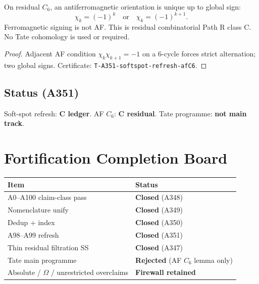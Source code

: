\begin{theorem}
\label{thm:A351-AF}
On residual $C_6$, an antiferromagnetic orientation is unique up to global sign:
\begin{equation}
\chi_k=(-1)^k
\quad\text{or}\quad
\chi_k=(-1)^{k+1}.
\end{equation}
Ferromagnetic signing is not AF. This is residual combinatorial Path R class C. No Tate cohomology is used or required.
\end{theorem}

\begin{proof}
Adjacent AF condition $\chi_k\chi_{k+1}=-1$ on a 6-cycle forces strict alternation; two global signs. Certificate: \texttt{T-A351-softspot-refresh-afC6}.
\end{proof}

\subsection*{Status (A351)}
Soft-spot refresh: \textbf{C ledger}. AF $C_6$: \textbf{C residual}. Tate programme: \textbf{not main track}.

\section*{Fortification Completion Board}
\begin{center}
\begin{tabular}{@{}p{4.8cm}p{7.2cm}@{}}
\toprule
Item & Status \\
\midrule
A0--A100 claim-class pass & \textbf{Closed} (A348) \\
Nomenclature unify & \textbf{Closed} (A349) \\
Dedup + index & \textbf{Closed} (A350) \\
A98--A99 refresh & \textbf{Closed} (A351) \\
Thin residual filtration SS & \textbf{Closed} (A347) \\
Tate main programme & \textbf{Rejected} (AF $C_6$ lemma only) \\
Absolute / $\Omega$ / unrestricted overclaims & \textbf{Firewall retained} \\
\bottomrule
\end{tabular}
\end{center}
